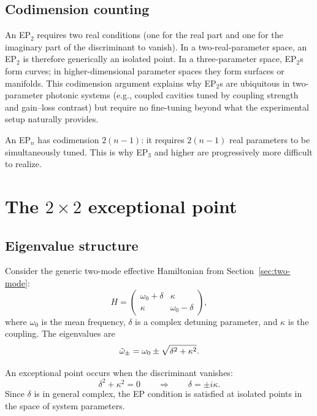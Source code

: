 \subsection{Codimension counting}
\label{ssec:codimension}

An EP$_2$ requires two real conditions (one for the real part and one for
the imaginary part of the discriminant to vanish). In a two-real-parameter
space, an EP$_2$ is therefore generically an isolated point. In a
three-parameter space, EP$_2$s form curves; in higher-dimensional
parameter spaces they form surfaces or manifolds. This codimension
argument explains why EP$_2$s are ubiquitous in two-parameter photonic
systems (e.g., coupled cavities tuned by coupling strength and gain--loss
contrast) but require no fine-tuning beyond what the experimental setup
naturally provides.

An EP$_n$ has codimension $2(n-1)$: it requires $2(n-1)$ real parameters
to be simultaneously tuned. This is why EP$_3$ and higher are
progressively more difficult to realize.


\section{The $2\times 2$ exceptional point}
\label{sec:ep2}

\subsection{Eigenvalue structure}
\label{ssec:ep2-eigenvalues}

Consider the generic two-mode effective Hamiltonian from
Section~\ref{sec:two-mode}:
\begin{equation}
 H =
 \begin{pmatrix}
 \omega_0 + \delta & \kappa \\
 \kappa & \omega_0 - \delta
 \end{pmatrix},
 \label{eq:ep-H}
\end{equation}
where $\omega_0$ is the mean frequency, $\delta$ is a complex detuning
parameter, and $\kappa$ is the coupling. The eigenvalues are
\begin{equation}
 \tilde{\omega}_\pm = \omega_0 \pm \sqrt{\delta^2 + \kappa^2}.
 \label{eq:ep-evals}
\end{equation}

An exceptional point occurs when the discriminant vanishes:
\begin{equation}
 \delta^2 + \kappa^2 = 0
 \qquad\Longrightarrow\qquad
 \delta = \pm i\kappa.
 \label{eq:ep-condition}
\end{equation}
Since $\delta$ is in general complex, the EP condition is satisfied at
isolated points in the space of system parameters.

